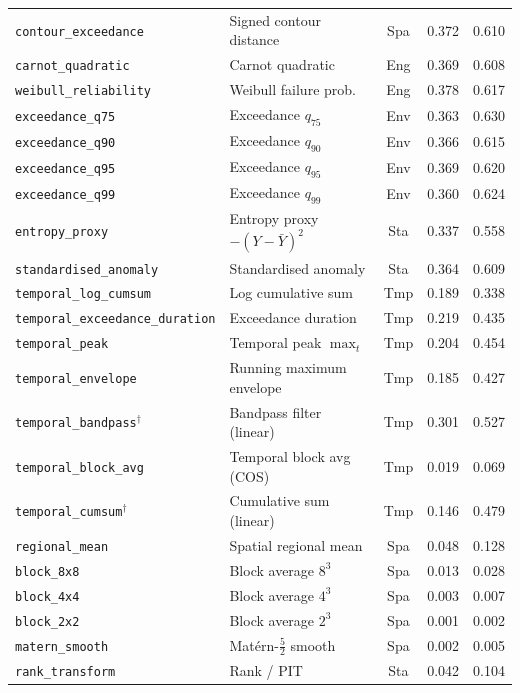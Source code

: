\documentclass[11pt,onecolumn]{article}
\begin{document}
\begin{table}[H]
\begin{tabular}{llccc}
\texttt{contour\_exceedance}           & Signed contour distance & Spa & 0.372 & 0.610 \\
\texttt{carnot\_quadratic}             & Carnot quadratic & Eng & 0.369 & 0.608 \\
\texttt{weibull\_reliability}          & Weibull failure prob. & Eng & 0.378 & 0.617 \\
\texttt{exceedance\_q75}               & Exceedance $q_{75}$ & Env & 0.363 & 0.630 \\
\texttt{exceedance\_q90}               & Exceedance $q_{90}$ & Env & 0.366 & 0.615 \\
\texttt{exceedance\_q95}               & Exceedance $q_{95}$ & Env & 0.369 & 0.620 \\
\texttt{exceedance\_q99}               & Exceedance $q_{99}$ & Env & 0.360 & 0.624 \\
\texttt{entropy\_proxy}                & Entropy proxy $-(Y-\bar Y)^2$ & Sta & 0.337 & 0.558 \\
\texttt{standardised\_anomaly}         & Standardised anomaly & Sta & 0.364 & 0.609 \\
\texttt{temporal\_log\_cumsum}         & Log cumulative sum & Tmp & 0.189 & 0.338 \\
\texttt{temporal\_exceedance\_duration}& Exceedance duration & Tmp & 0.219 & 0.435 \\
\texttt{temporal\_peak}                & Temporal peak $\max_t$ & Tmp & 0.204 & 0.454 \\
\texttt{temporal\_envelope}            & Running maximum envelope & Tmp & 0.185 & 0.427 \\
\texttt{temporal\_bandpass}${}^\dagger$& Bandpass filter (linear) & Tmp & 0.301 & 0.527 \\
\texttt{temporal\_block\_avg}          & Temporal block avg (COS) & Tmp & 0.019 & 0.069 \\
\texttt{temporal\_cumsum}${}^\dagger$  & Cumulative sum (linear) & Tmp & 0.146 & 0.479 \\
\texttt{regional\_mean}                & Spatial regional mean & Spa & 0.048 & 0.128 \\
\texttt{block\_8x8}                    & Block average $8^3$ & Spa & 0.013 & 0.028 \\
\texttt{block\_4x4}                    & Block average $4^3$ & Spa & 0.003 & 0.007 \\
\texttt{block\_2x2}                    & Block average $2^3$ & Spa & 0.001 & 0.002 \\
\texttt{matern\_smooth}                & Matérn-$\frac{5}{2}$ smooth & Spa & 0.002 & 0.005 \\
\texttt{rank\_transform}               & Rank / PIT & Sta & 0.042 & 0.104 \\
\bottomrule
\end{tabular}
\end{table}
\end{document}
